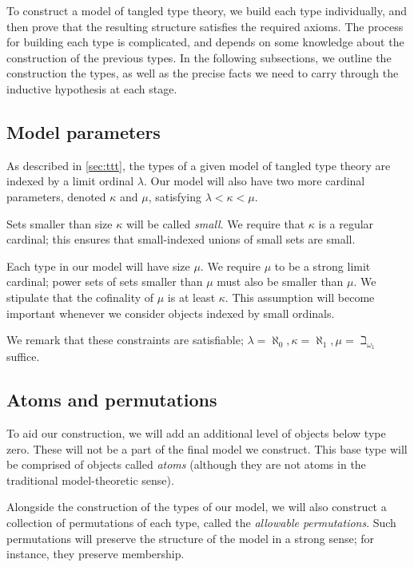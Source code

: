 To construct a model of tangled type theory, we build each type individually, and then prove that the resulting structure satisfies the required axioms.
The process for building each type is complicated, and depends on some knowledge about the construction of the previous types.
In the following subsections, we outline the construction the types, as well as the precise facts we need to carry through the inductive hypothesis at each stage.

\subsection{Model parameters}

As described in \cref{sec:ttt}, the types of a given model of tangled type theory are indexed by a limit ordinal \( \lambda \).
Our model will also have two more cardinal parameters, denoted \( \kappa \) and \( \mu \), satisfying \( \lambda < \kappa < \mu \).

Sets smaller than size \( \kappa \) will be called \emph{small}.
We require that \( \kappa \) is a regular cardinal; this ensures that small-indexed unions of small sets are small.

Each type in our model will have size \( \mu \).
We require \( \mu \) to be a strong limit cardinal; power sets of sets smaller than \( \mu \) must also be smaller than \( \mu \).
We stipulate that the cofinality of \( \mu \) is at least \( \kappa \).
This assumption will become important whenever we consider objects indexed by small ordinals.

We remark that these constraints are satisfiable; \( \lambda = \aleph_0, \kappa = \aleph_1, \mu = \beth_{\omega_1} \) suffice.

\subsection{Atoms and permutations}

To aid our construction, we will add an additional level of objects below type zero.
These will not be a part of the final model we construct.
This base type will be comprised of objects called \emph{atoms} (although they are not atoms in the traditional model-theoretic sense).

Alongside the construction of the types of our model, we will also construct a collection of permutations of each type, called the \emph{allowable permutations}.
Such permutations will preserve the structure of the model in a strong sense; for instance, they preserve membership.


